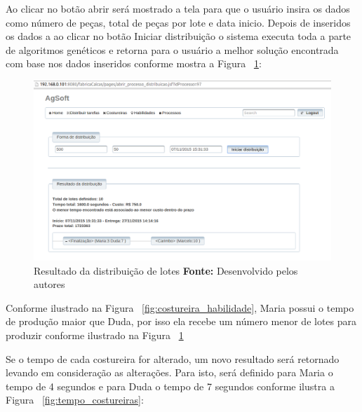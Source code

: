 \par Ao clicar no botão abrir será mostrado a tela para que o usuário insira os
dados como número de peças, total de peças por lote e data inicio. Depois de
inseridos os dados a ao clicar no botão Iniciar distribuição o sistema executa
toda a parte de algoritmos genéticos e retorna para o usuário a melhor solução
encontrada com base nos dados inseridos conforme mostra a Figura
~\ref{fig:resultado_distribuicao_teste1}:


\begin{figure}[h!]
	\centerline{\includegraphics[scale=0.4]{./imagens/resultado_distribuicao_teste1.png}}
	\caption[Resultado da distribuição de lotes]
	{Resultado da distribuição de lotes \textbf{Fonte:} Desenvolvido pelos autores}
	\label{fig:resultado_distribuicao_teste1}
\end{figure}

\par Conforme ilustrado na Figura ~\ref{fig:costureira_habilidade}, Maria possui
o tempo de produção maior que Duda, por isso ela recebe um número menor de lotes
para produzir conforme ilustrado na Figura
~\ref{fig:resultado_distribuicao_teste1}

\par Se o tempo de cada costureira for alterado, um novo resultado será
retornado levando em consideração as alterações. Para isto, será definido para
Maria o tempo de 4 segundos e para Duda o tempo de 7 segundos conforme ilustra a
Figura ~\ref{fig:tempo_costureiras}: 

\newpage

